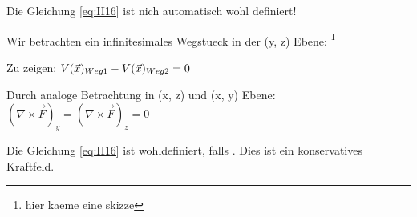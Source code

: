 \documentclass{article}
\begin{document}

Die Gleichung \ref{eq:II16} ist nich automatisch wohl definiert!

Wir betrachten ein infinitesimales Wegstueck in der (y, z) Ebene: \footnote{hier kaeme eine skizze}

Zu zeigen: $V(\vec{x})_{Weg 1} - V(\vec{x})_{Weg 2} = 0 $ 


Durch analoge Betrachtung in (x, z) und (x, y) Ebene: $(\nabla \times \vec{F})_y = (\nabla \times \vec{F})_z = 0$

Die Gleichung \ref{eq:II16} ist wohldefiniert, falls 
. Dies ist ein konservatives Kraftfeld.
\end{document}
